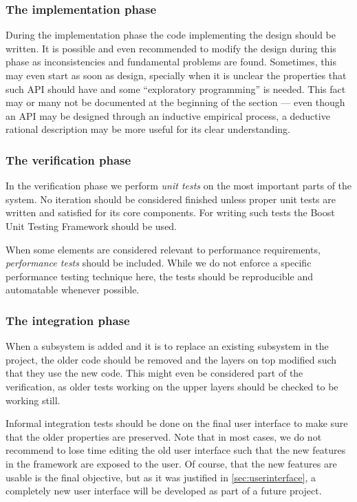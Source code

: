 \subsubsection{The implementation phase}

During the implementation phase the code implementing the design
should be written. It is possible and even recommended to modify the
design during this phase as inconsistencies and fundamental problems
are found. Sometimes, this may even start as soon as design, specially
when it is unclear the properties that such API should have and some
``exploratory programming'' is needed. This fact may or many not be
documented at the beginning of the section --- even though an API may
be designed through an inductive empirical process, a deductive
rational description may be more useful for its clear understanding.

\subsubsection{The verification phase}

In the verification phase we perform \emph{unit tests} on the most
important parts of the system. No iteration should be considered
finished unless proper unit tests are written and satisfied for its
core components. For writing such tests the Boost Unit Testing
Framework should be used.

When some elements are considered relevant to performance
requirements, \emph{performance tests} should be included. While we do
not enforce a specific performance testing technique here, the
tests should be reproducible and automatable whenever possible.

\subsubsection{The integration phase}

When a subsystem is added and it is to replace an existing subsystem
in the project, the older code should be removed and the layers on top
modified such that they use the new code. This might even be
considered part of the verification, as older tests working on the
upper layers should be checked to be working still.

Informal integration tests should be done on the final user interface
to make sure that the older properties are preserved. Note that in
most cases, we do not recommend to lose time editing the old user
interface such that the new features in the framework are exposed to
the user. Of course, that the new features are usable is the final
objective, but as it was justified in \ref{sec:userinterface}, a
completely new user interface will be developed as part of a future
project.

